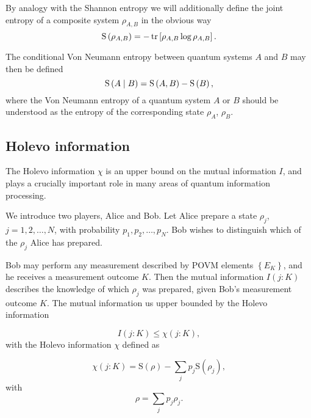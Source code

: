 By analogy with the Shannon entropy we will additionally define the joint entropy of a composite system $\rho_{A, B}$ in the obvious way
\begin{equation}
\text{S}\left(\rho_{A, B}\right) = - \tr\left[\rho_{A, B} \log \rho_{A, B}\right].
\end{equation}

\noindent The conditional Von Neumann entropy between quantum systems $A$ and $B$ may then be defined
\begin{equation}
\text{S}\left(A \; \middle| \; B\right) = \text{S}\left(A, B\right) - \text{S}\left(B\right),
\end{equation}
where the Von Neumann entropy of a quantum system $A$ or $B$ should be understood as the entropy of the corresponding state $\rho_A$, $\rho_B$.


\FloatBarrier
\subsection{Holevo information}\label{sec:intro_holevo}
The Holevo information $\chi$ is an upper bound on the mutual information $I$, and plays a crucially important role in many areas of quantum information processing. 

We introduce two players, Alice and Bob. Let Alice prepare a state $\rho_j$, $j = 1, 2, \dots, N$, with probability $p_1, p_2, \dots, p_N$. Bob wishes to distinguish which of the $\rho_j$ Alice has prepared. 

Bob may perform any measurement described by POVM elements $\left\{E_K\right\}$, and he receives a measurement outcome $K$. Then the mutual information $I\left(j : K\right)$ describes the knowledge of which $\rho_j$ was prepared, given Bob's measurement outcome $K$. The mutual information us upper bounded by the Holevo information

\begin{equation}\label{eqn:intro_holevo_bound}
I\left(j : K \right) \le \chi \left(j : K \right),
\end{equation}
with the Holevo information $\chi$ defined as

\begin{equation}\label{eqn:intro_holevo}
\chi\left(j : K\right)  = \text{S}\left(\rho\right) - \sum_j p_j \text{S}\left(\rho_j\right),
\end{equation}
with
\begin{equation}
\rho = \sum_j p_j \rho_j.
\end{equation}


